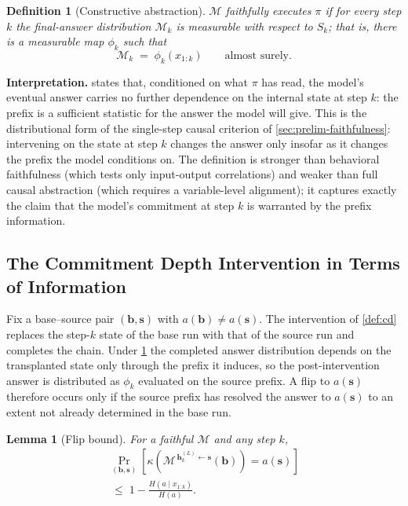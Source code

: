 \documentclass[11pt]{article}
\newtheorem{definition}{Definition}
\newtheorem{lemma}{Lemma}
\newcommand{\stepk}{k}
\begin{document}
\begin{definition}[Constructive abstraction]
\label{def:abstraction}
$\mathcal{M}$ \emph{faithfully executes} $\pi$ if for every step $\stepk$ the
final-answer distribution $\mathcal{M}_{\stepk}$ is measurable with respect to
$S_{\stepk}$; that is, there is a measurable map $\phi_{\stepk}$ such that
\begin{equation}
\label{eq:abstraction}
\mathcal{M}_{\stepk} \;=\; \phi_{\stepk}\!\left(x_{1{:}\stepk}\right)
\qquad\text{almost surely.}
\end{equation}
\end{definition}

\noindent\textbf{Interpretation.}
 states that, conditioned on what $\pi$ has read, the
model's eventual answer carries no further dependence on the internal state at
step $\stepk$: the prefix is a sufficient statistic for the answer the model
will give. This is the distributional form of the single-step causal criterion
of \cref{sec:prelim-faithfulness}: intervening on the state at step
$\stepk$ changes the answer only insofar as it changes the prefix the model
conditions on. The definition is stronger than behavioral faithfulness (which
tests only input-output correlations) and weaker than full causal abstraction
(which requires a variable-level alignment); it captures exactly the claim that
the model's commitment at step $\stepk$ is warranted by the prefix information.

\subsection{The Commitment Depth Intervention in Terms of Information}
\label{app:proof-cd}

Fix a base--source pair $(\mathbf{b},\mathbf{s})$ with $a(\mathbf{b})\neq
a(\mathbf{s})$. The intervention of \cref{def:cd} replaces the step-$\stepk$
state of the base run with that of the source run and completes the chain.
Under \cref{def:abstraction} the completed answer distribution depends on the
transplanted state only through the prefix it induces, so the post-intervention
answer is distributed as $\phi_{\stepk}$ evaluated on the source prefix. A flip
to $a(\mathbf{s})$ therefore occurs only if the source prefix has resolved the
answer to $a(\mathbf{s})$ to an extent not already determined in the base run.

\begin{lemma}[Flip bound]
\label{lem:flip}
For a faithful $\mathcal{M}$ and any step $\stepk$,
\begin{equation}
\label{eq:flipbound}
\begin{split}
\Pr_{(\mathbf{b},\mathbf{s})}\!\left[\kappa\!\left(
\mathcal{M}^{\,\mathbf{h}^{(L)}_{\stepk}\leftarrow\mathbf{s}}(\mathbf{b})\right)
= a(\mathbf{s})\right] \\
\;\le\; 1 - \frac{H\!\left(a\mid x_{1{:}\stepk}\right)}{H(a)} .
\end{split}
\end{equation}
\end{lemma}
\end{document}
